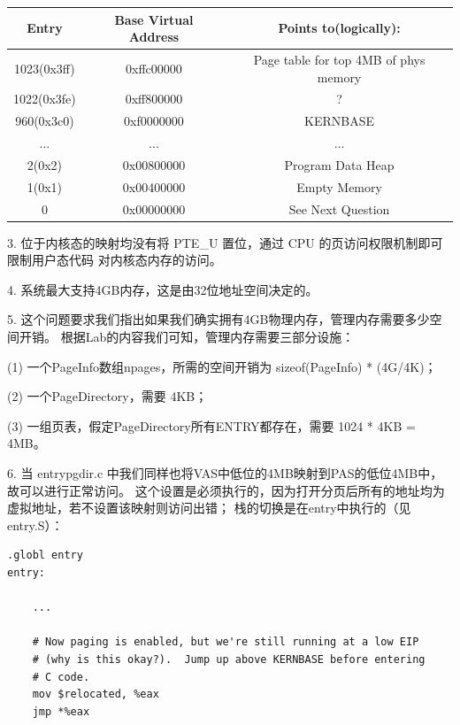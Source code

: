 \documentclass[12pt, letterpaper]{report}
\begin{document}
\begin{tabular}{|c|c|c|}
    \hline  
    Entry&Base Virtual Address&Points to(logically):\\
    \hline 
    1023(0x3ff)&0xffc00000&Page table for top 4MB of phys memory\\
    \hline 
    1022(0x3fe)&0xff800000&?\\
    \hline 
    960(0x3c0)&0xf0000000&KERNBASE\\
    \hline 
    ...&...&...\\
    \hline 
    2(0x2)&0x00800000&Program Data Heap\\
    \hline 
    1(0x1)&0x00400000&Empty Memory\\
    \hline 
    0&0x00000000&See Next Question\\
    \hline %
\end{tabular}

\quad \par 
\quad \par 
3. 位于内核态的映射均没有将 PTE\_U 置位，通过 CPU 的页访问权限机制即可限制用户态代码
   对内核态内存的访问。\par 
\quad \par 
4. 系统最大支持4GB内存，这是由32位地址空间决定的。\par 
\quad \par
5. 这个问题要求我们指出如果我们确实拥有4GB物理内存，管理内存需要多少空间开销。
根据Lab的内容我们可知，管理内存需要三部分设施：\par 
(1) 一个PageInfo数组npages，所需的空间开销为 sizeof(PageInfo) * (4G/4K)；\par 
(2) 一个PageDirectory，需要 4KB；\par 
(3) 一组页表，假定PageDirectory所有ENTRY都存在，需要 1024 * 4KB = 4MB。\par 
\quad \par 
6. 当 entrypgdir.c 中我们同样也将VAS中低位的4MB映射到PAS的低位4MB中，故可以进行正常访问。
这个设置是必须执行的，因为打开分页后所有的地址均为虚拟地址，若不设置该映射则访问出错；
栈的切换是在entry中执行的（见entry.S）：\par 

\lstset{style=MakeFileStyle}
\setmainfont{Consolas}
\begin{lstlisting}
.globl entry
entry:

    ...

    # Now paging is enabled, but we're still running at a low EIP
    # (why is this okay?).  Jump up above KERNBASE before entering
    # C code.
    mov	$relocated, %eax
    jmp	*%eax
\end{lstlisting}
\setmainfont{Times New Roman}
\end{document}
